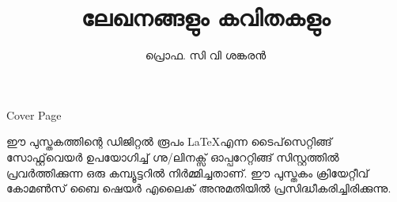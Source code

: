 \documentclass[12pt,a4paper]{book}
\title{\fontsize{40pt}{1em}\selectfont \color{white}ലേഖനങ്ങളും കവിതകളും}
\author{\fontsize{20pt}{1em}\selectfont \color{white} പ്രൊഫ. സി വി ശങ്കരൻ}
\date{}
\newcommand*\cleartoleftpage{%
  \clearpage
  \ifodd\value{page}\hbox{}\newpage\fi
}
\begin{document}
\pagecolor{Maroon}
\maketitle
\pagecolor{white}
\newpage\null\thispagestyle{empty}\newpage %
\newpage
Cover Page
\newpage
\vspace*{\fill}
\noindent
\parbox{10.5cm}{
ഈ പുസ്തകത്തിന്റെ ഡിജിറ്റൽ രൂപം \LaTeX എന്ന ടൈപ്‌സെറ്റിങ്ങ് സോഫ്റ്റ്‌വെയർ ഉപയോഗിച്ച് ഗ്നു/ലിനക്സ് ഓപ്പറേറ്റിങ്ങ് സിസ്റ്റത്തിൽ പ്രവർത്തിക്കുന്ന ഒരു കമ്പ്യൂട്ടറിൽ നിർമ്മിച്ചതാണ്. ഈ പുസ്തകം ക്രിയേറ്റീവ് കോമൺസ് ബൈ ഷെയർ എലൈക് അനുമതിയിൽ പ്രസിദ്ധീകരിച്ചിരിക്കുന്നു.}
\cleartoleftpage
\tableofcontents
\newpage\null\thispagestyle{empty} %
\cleartoleftpage
\setcounter{page}{1} %
\lfoot{}
\rfoot{}
\cfoot{\thepage} %
\lhead{}
\chead{}
\pagestyle{fancy}
\renewcommand{\headrulewidth}{0pt}



























\newpage
\pagecolor{Maroon}
\newpage\null\thispagestyle{empty}\newpage %
\end{document}
